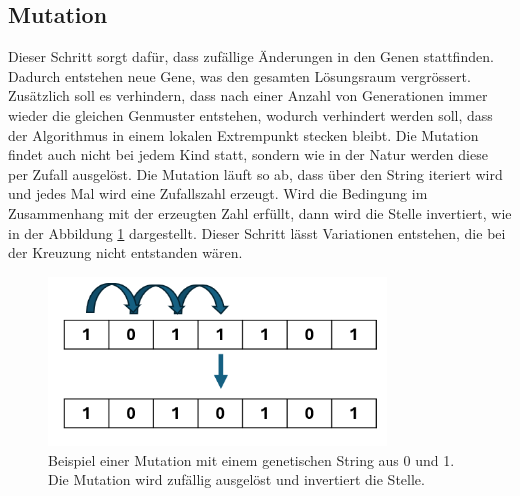 %
%
%
%
\subsection{Mutation
\label{buch:paper:varalg:subsection:mutation}}
Dieser Schritt sorgt dafür, dass zufällige Änderungen in 
den Genen stattfinden. Dadurch entstehen neue Gene, was den 
gesamten Lösungsraum vergrössert. Zusätzlich soll es verhindern,
dass nach einer Anzahl von Generationen immer wieder die
gleichen Genmuster entstehen, wodurch verhindert werden soll, dass 
der Algorithmus in einem lokalen Extrempunkt stecken bleibt. 
Die Mutation findet auch nicht bei jedem Kind
statt, sondern wie in der Natur werden diese per Zufall
ausgelöst. Die Mutation läuft so ab, dass über den String
iteriert wird und jedes Mal wird eine Zufallszahl erzeugt. Wird 
die Bedingung im Zusammenhang mit der erzeugten Zahl erfüllt, dann wird 
die Stelle invertiert, wie in der
Abbildung \ref{fig:mutation_genetic_string} dargestellt. Dieser Schritt 
lässt Variationen entstehen, die bei der Kreuzung nicht entstanden wären. 
\begin{figure}
	\centering
	\includegraphics[width=0.8\textwidth]{
        papers/varalg/images/teil3/09GeneticStringMutation.png
        }
	\caption{
	Beispiel einer Mutation mit einem genetischen String aus 0 und 1. Die
	Mutation wird zufällig ausgelöst und invertiert die Stelle.
	}
	\label{fig:mutation_genetic_string}
\end{figure}

